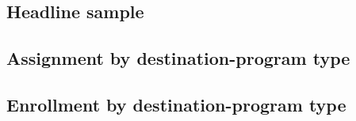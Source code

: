 \documentclass[
]{article}
\begin{document}
\hypertarget{headline-sample}{%
\subsection{Headline sample}\label{headline-sample}}

\hypertarget{assignment-by-destination-program-type}{%
\subsection{Assignment by destination-program
type}\label{assignment-by-destination-program-type}}

\begin{table}[htbp]
   \caption{Assignment by Destination-Program Type and Gender}\label{tab: gender assigned by program type}
   \centerline{}
\end{table}

\hypertarget{enrollment-by-destination-program-type}{%
\subsection{Enrollment by destination-program
type}\label{enrollment-by-destination-program-type}}
\end{document}
